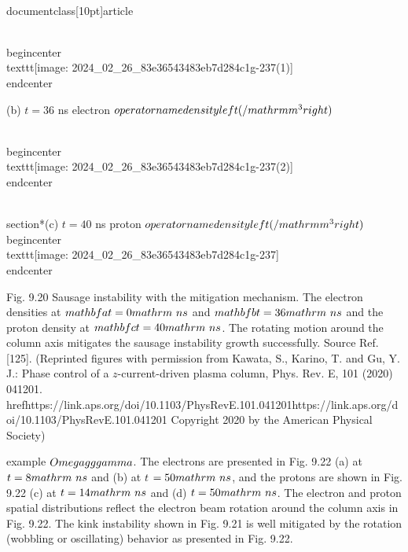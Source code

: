 \\documentclass[10pt]{article}
\begin{document}
{{{{{{\\begin{center}
\\texttt{[image: 2024\_02\_26\_83e36543483eb7d284c1g-237(1)]}
\\end{center}

(b) $t=36$ ns electron $\\operatorname{density}\\left(/ \\mathrm{m}^{3}\\right)$

\\begin{center}
\\texttt{[image: 2024\_02\_26\_83e36543483eb7d284c1g-237(2)]}
\\end{center}

\\section*{(c) $t=40$ ns proton $\\operatorname{density}\\left(/ \\mathrm{m}^{3}\\right)$}
\\begin{center}
\\texttt{[image: 2024\_02\_26\_83e36543483eb7d284c1g-237]}
\\end{center}

Fig. 9.20 Sausage instability with the mitigation mechanism. The electron densities at $\\mathbf{a} t=0 \\mathrm{~ns}$ and $\\mathbf{b} t=36 \\mathrm{~ns}$ and the proton density at $\\mathbf{c} t=40 \\mathrm{~ns}$. The rotating motion around the column axis mitigates the sausage instability growth successfully. Source Ref. [125]. (Reprinted figures with permission from Kawata, S., Karino, T. and Gu, Y. J.: Phase control of a $z$-current-driven plasma column, Phys. Rev. E, 101 (2020) 041201. \\href{https://link.aps.org/doi/10.1103/PhysRevE.101.041201}{https://link.aps.org/doi/10.1103/PhysRevE.101.041201} Copyright 2020 by the American Physical Society)

example $\\Omega \\gg \\gamma$. The electrons are presented in Fig. 9.22 (a) at $t=8 \\mathrm{~ns}$ and (b) at $t$ $=50 \\mathrm{~ns}$, and the protons are shown in Fig. 9.22 (c) at $t=14 \\mathrm{~ns}$ and (d) $t=50 \\mathrm{~ns}$. The electron and proton spatial distributions reflect the electron beam rotation around the column axis in Fig. 9.22. The kink instability shown in Fig. 9.21 is well mitigated by the rotation (wobbling or oscillating) behavior as presented in Fig. 9.22.

}}}}}}
\end{document}

